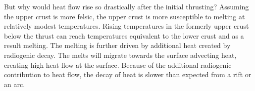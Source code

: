But why would heat flow rise so drastically after the initial thrusting?
Assuming the upper crust is more felsic, the upper crust is more
susceptible to melting at relatively modest temperatures.  Rising
temperatures in the formerly upper crust below the thrust can reach
temperatures equivalent to the lower crust and as a result melting.  The
melting is further driven by additional heat created by radiogenic
decay.  The melts will migrate towards the surface advecting heat,
creating high heat flow at the surface.  Because of the additional
radiogenic contribution to heat flow, the decay of heat is slower than
expected from a rift or an arc.

